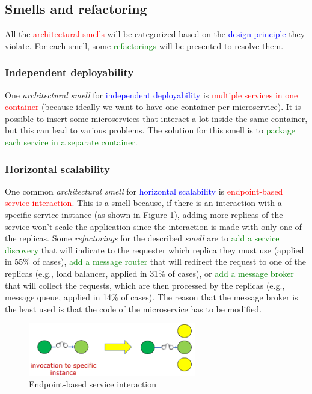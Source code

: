 \subsection{Smells and refactoring}

All the \textcolor{red}{architectural smells} will be categorized based on the \textcolor{blue}{design principle} they violate. For each smell, some \textcolor{green}{refactorings} will be presented to resolve them.

\subsubsection{Independent deployability}

One \textit{architectural smell} for \textcolor{blue}{independent deployability} is \textcolor{red}{multiple services in one container} (because ideally we want to have one container per microservice). It is possible to insert some microservices that interact a lot inside the same container, but this can lead to various problems. The solution for this smell is to \textcolor{green}{package each service in a separate container}.

\subsubsection{Horizontal scalability}

One common \textit{architectural smell} for \textcolor{blue}{horizontal scalability} is \textcolor{red}{endpoint-based service interaction}. This is a smell because, if there is an interaction with a specific service instance (as shown in Figure \ref{fig:end-point-img1}), adding more replicas of the service won't scale the application since the interaction is made with only one of the replicas. Some \textit{refactorings} for the described \textit{smell} are to \textcolor{green}{add a service discovery} that will indicate to the requester which replica they must use (applied in 55\% of cases), \textcolor{green}{add a message router} that will redirect the request to one of the replicas (e.g., load balancer, applied in 31\% of cases), or \textcolor{green}{add a message broker} that will collect the requests, which are then processed by the replicas (e.g., message queue, applied in 14\% of cases). The reason that the message broker is the least used is that the code of the microservice has to be modified.

\begin{figure} [H]
    \centering
    \includegraphics[width=0.65\textwidth]{images/Microservices/end-point-img1.PNG}
    \caption{Endpoint-based service interaction}
    \label{fig:end-point-img1}
\end{figure} 

